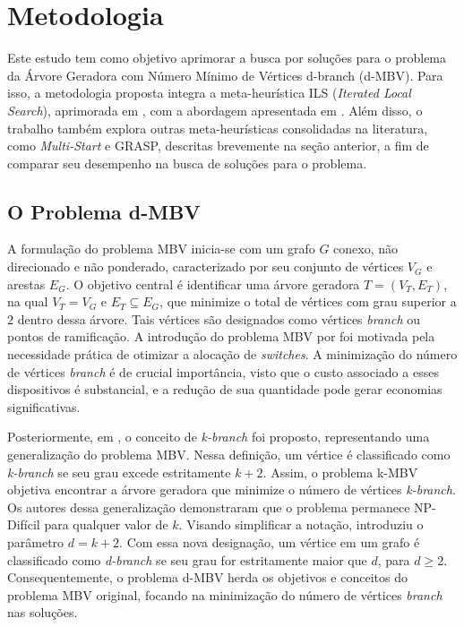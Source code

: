 \section{Metodologia}
\label{sec-metodo}
Este estudo tem como objetivo aprimorar a busca por soluções para o problema da Árvore Geradora com Número Mínimo de Vértices d-branch (d-MBV). Para isso, a metodologia proposta integra a meta-heurística ILS (\textit{Iterated Local Search}), aprimorada em \cite{silva2024ils}, com a abordagem apresentada em \cite{lima2024ils}. Além disso, o trabalho também explora outras meta-heurísticas consolidadas na literatura, como \textit{Multi-Start} e GRASP, descritas brevemente na seção anterior, a fim de comparar seu desempenho na busca de soluções para o problema.

\subsection{O Problema d-MBV}
\label{dMBV}

A formulação do problema MBV inicia-se com um grafo \( G \) conexo, não direcionado e não ponderado, caracterizado por seu conjunto de vértices \( V_G \) e arestas \( E_G \). O objetivo central é identificar uma árvore geradora \( T = (V_T, E_T) \), na qual \( V_T = V_G \) e \( E_T \subseteq E_G \), que minimize o total de vértices com grau superior a \( 2 \) dentro dessa árvore. Tais vértices são designados como vértices \textit{branch} ou pontos de ramificação. A introdução do problema MBV por \citep{gargano:2002} foi motivada pela necessidade prática de otimizar a alocação de \textit{switches}. A minimização do número de vértices \textit{branch} é de crucial importância, visto que o custo associado a esses dispositivos é substancial, e a redução de sua quantidade pode gerar economias significativas.

Posteriormente, em \cite{merabet:2018}, o conceito de \textit{k-branch} foi proposto, representando uma generalização do problema MBV. Nessa definição, um vértice é classificado como \textit{k-branch} se seu grau excede estritamente \( k + 2 \). Assim, o problema k-MBV objetiva encontrar a árvore geradora que minimize o número de vértices \textit{k-branch}. Os autores dessa generalização demonstraram que o problema permanece NP-Difícil para qualquer valor de \( k \). Visando simplificar a notação, \cite{morenotese:2018} introduziu o parâmetro \( d = k + 2 \). Com essa nova designação, um vértice em um grafo é classificado como \textit{d-branch} se seu grau for estritamente maior que \( d \), para $d \ge 2$. Consequentemente, o problema d-MBV herda os objetivos e conceitos do problema MBV original, focando na minimização do número de vértices \textit{branch} nas soluções.




